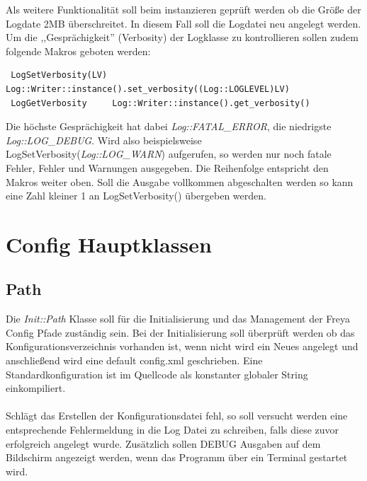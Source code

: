 Als weitere Funktionalität soll beim instanzieren geprüft werden ob die Größe der Logdate 2MB überschreitet. In diesem Fall soll die Logdatei neu angelegt werden.
Um die ,,Gesprächigkeit'' (Verbosity) der Logklasse zu kontrollieren sollen zudem folgende Makros geboten werden:
\begin{verbatim}
 LogSetVerbosity(LV) Log::Writer::instance().set_verbosity((Log::LOGLEVEL)LV)
 LogGetVerbosity     Log::Writer::instance().get_verbosity()
\end{verbatim}
Die höchste Gesprächigkeit hat dabei \emph{Log::FATAL\_ERROR}, die niedrigste \emph{Log::LOG\_DEBUG}. Wird also beispielsweise LogSetVerbosity(\emph{Log::LOG\_WARN}) aufgerufen, so
werden nur noch fatale Fehler, Fehler und Warnungen ausgegeben. Die Reihenfolge entspricht den Makros weiter oben.
Soll die Ausgabe vollkommen abgeschalten werden so kann eine Zahl kleiner 1 an LogSetVerbosity() übergeben werden.


\section{Config Hauptklassen}

\subsection{Path}
Die \emph{Init::Path} Klasse soll für die Initialisierung und das Management der Freya Config Pfade zuständig sein.
Bei der Initialisierung soll überprüft werden ob das Konfigurationsverzeichnis vorhanden ist, wenn nicht wird ein Neues
angelegt und anschließend wird eine default config.xml geschrieben. Eine Standardkonfiguration ist im Quellcode als 
konstanter globaler String einkompiliert.
\\
\\
Schlägt das Erstellen der Konfigurationsdatei fehl, so soll versucht werden eine entsprechende Fehlermeldung in die Log Datei zu schreiben, 
falls diese zuvor erfolgreich angelegt wurde. Zusätzlich sollen DEBUG Ausgaben auf dem Bildschirm angezeigt werden, wenn das Programm
über ein Terminal gestartet wird.

